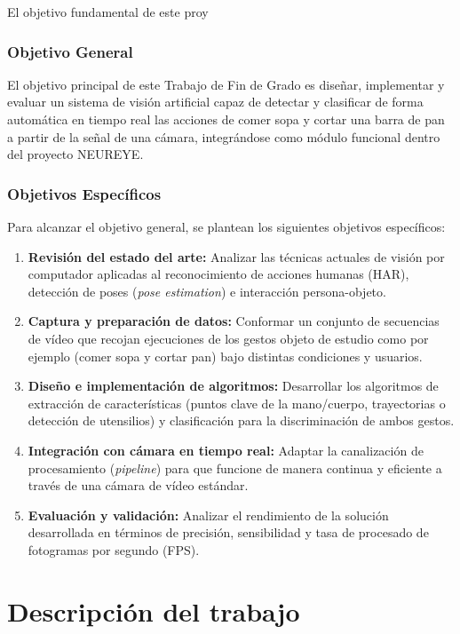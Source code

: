 \documentclass[11pt,a4paper,oneside]{article}
\begin{document}
		El objetivo fundamental de este proy\subsubsection{Objetivo General}
		El objetivo principal de este Trabajo de Fin de Grado es diseñar, implementar y evaluar un sistema de visión artificial capaz de detectar y clasificar de forma automática en tiempo real las acciones de comer sopa y cortar una barra de pan a partir de la señal de una cámara, integrándose como módulo funcional dentro del proyecto NEUREYE.
		
		\subsubsection{Objetivos Específicos}
		Para alcanzar el objetivo general, se plantean los siguientes objetivos específicos:
		
		\begin{enumerate}
			\item \textbf{Revisión del estado del arte:} Analizar las técnicas actuales de visión por computador aplicadas al reconocimiento de acciones humanas (HAR), detección de poses (\textit{pose estimation}) e interacción persona-objeto.
			\item \textbf{Captura y preparación de datos:} Conformar un conjunto de secuencias de vídeo que recojan ejecuciones de los gestos objeto de estudio como por ejemplo (comer sopa y cortar pan) bajo distintas condiciones y usuarios.
			\item \textbf{Diseño e implementación de algoritmos:} Desarrollar los algoritmos de extracción de características (puntos clave de la mano/cuerpo, trayectorias o detección de utensilios) y clasificación para la discriminación de ambos gestos.
			\item \textbf{Integración con cámara en tiempo real:} Adaptar la canalización de procesamiento (\textit{pipeline}) para que funcione de manera continua y eficiente a través de una cámara de vídeo estándar.
			\item \textbf{Evaluación y validación:} Analizar el rendimiento de la solución desarrollada en términos de precisión, sensibilidad y tasa de procesado de fotogramas por segundo (FPS).
		\end{enumerate}
		
		
		
		
		
		\section{Descripción del trabajo}
		\label{sec:descr-del-trab}
		
\end{document}
